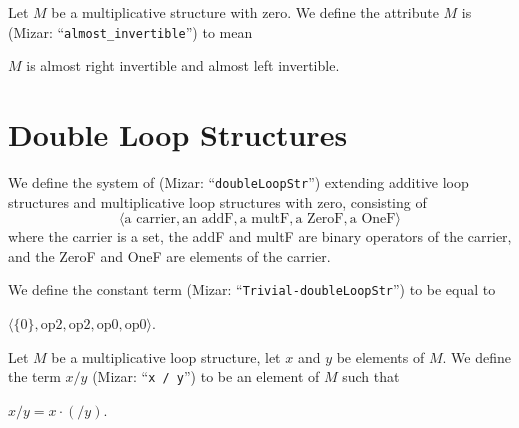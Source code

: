 \documentclass{article}
\begin{document}
\begin{definition}
Let $M$ be a multiplicative structure with zero.
We define the attribute $M$ is 
(Mizar: ``\verb#almost_invertible#'')
to mean
\begin{defn}
\item $M$ is almost right invertible and almost left invertible.
\end{defn}
\end{definition}

\section{Double Loop Structures}

\begin{definition}%
We define the system of 
(Mizar: ``\verb#doubleLoopStr#'') extending additive loop structures and
multiplicative loop structures with zero, consisting of
\[\langle\mbox{a carrier}, \mbox{an addF}, \mbox{a multF}, \mbox{a ZeroF}, \mbox{a OneF}\rangle\]
where the carrier is a set, the addF and multF are binary operators of
the carrier, and the ZeroF and OneF are elements of the carrier.
\end{definition}

\begin{definition}
We define the constant term  (Mizar: ``\verb#Trivial-doubleLoopStr#'')
to be equal to
\begin{defn}%
\item $\langle\{0\},\mbox{op2},\mbox{op2},\mbox{op0},\mbox{op0}\rangle$.
\end{defn}
\end{definition}

\begin{definition}
Let $M$ be a multiplicative loop structure, let $x$ and $y$ be elements
of $M$.
We define the term $x/y$
(Mizar: ``\verb#x / y#'')
 to be an element of $M$ such that
\begin{defn}%
\item $x/y = x\cdot(/y)$.
\end{defn}
\end{definition}
\end{document}
